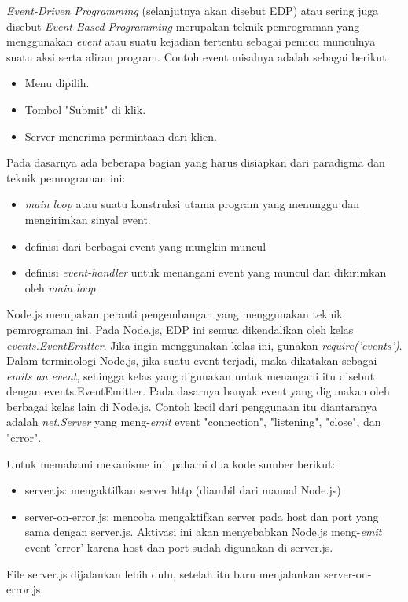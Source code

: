 \textit{Event-Driven Programming} (selanjutnya akan disebut EDP) atau sering juga disebut \textit{Event-Based Programming} merupakan teknik pemrograman yang menggunakan \textit{event} atau suatu kejadian tertentu sebagai pemicu munculnya suatu aksi serta aliran program. Contoh event misalnya adalah sebagai berikut:
\begin{itemize}
	\item Menu dipilih.
	\item Tombol "Submit" di klik.
	\item Server menerima permintaan dari klien.
\end{itemize}
Pada dasarnya ada beberapa bagian yang harus disiapkan dari paradigma dan teknik pemrograman ini:
\begin{itemize}
	\item \textit{main loop} atau suatu konstruksi utama program yang menunggu dan mengirimkan sinyal event.
	\item definisi dari berbagai event yang mungkin muncul
	\item definisi \textit{event-handler} untuk menangani event yang muncul dan dikirimkan oleh \textit{main loop}
\end{itemize}
Node.js merupakan peranti pengembangan yang menggunakan teknik pemrograman ini. Pada Node.js, EDP ini semua dikendalikan oleh kelas \textit{events.EventEmitter}. Jika ingin menggunakan kelas ini, gunakan \textit{require('events')}. Dalam terminologi Node.js, jika suatu event terjadi, maka dikatakan sebagai \textit{emits an event}, sehingga kelas yang digunakan untuk menangani itu disebut dengan events.EventEmitter. Pada dasarnya banyak event yang digunakan oleh berbagai kelas lain di Node.js. Contoh kecil dari penggunaan itu diantaranya adalah \textit{net.Server} yang meng-\textit{emit} event "connection", "listening", "close", dan "error".

Untuk memahami mekanisme ini, pahami dua kode sumber berikut:
\begin{itemize}
	\item server.js: mengaktifkan server http (diambil dari manual Node.js)
	\item server-on-error.js: mencoba mengaktifkan server pada host dan port yang sama dengan server.js. Aktivasi ini akan menyebabkan Node.js meng-\textit{emit} event 'error' karena host dan port sudah digunakan di server.js.
\end{itemize}
File server.js dijalankan lebih dulu, setelah itu baru menjalankan server-on-error.js.

